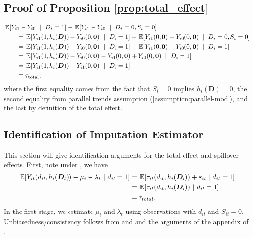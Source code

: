 \subsection{Proof of Proposition \ref{prop:total_effect}}

\begin{align*}
    &\expec{Y_{i1} - Y_{i0} \ \mid \ D_i = 1} - \expec{Y_{i1} - Y_{i0} \ \mid \ D_i = 0, S_i =0} \\
    &\quad\quad= \expec{Y_{i1}(1, h_i(\bm{D})) - Y_{i0}(0, \bm{0}) \ \mid \ D_i = 1} - \expec{Y_{i1}(0, \bm{0}) - Y_{i0}(0, \bm{0}) \ \mid \ D_i = 0, S_i =0} \\
    &\quad\quad= \expec{Y_{i1}(1, h_i(\bm{D})) - Y_{i0}(0, \bm{0}) \ \mid \ D_i = 1} - \expec{Y_{i1}(0, \bm{0}) - Y_{i0}(0, \bm{0}) \ \mid \ D_i = 1} \\
    &\quad\quad= \expec{Y_{i1}(1, h_i(\bm{D})) - Y_{i0}(0, \bm{0}) - Y_{i1}(0, \bm{0}) + Y_{i0}(0, \bm{0}) \ \mid \ D_i = 1} \\
    &\quad\quad= \expec{Y_{i1}(1, h_i(\bm{D})) - Y_{i1}(0, \bm{0}) \ \mid \ D_i = 1} \\
    &\quad\quad\equiv \tau_{\text{total}},
\end{align*}
where the first equality comes from the fact that $S_i = 0$ implies $h_i(\bm{D}) = 0$, the second equality from parallel trends assumption (\ref{assumption:parallel-mod}), and the last by definition of the total effect.



\subsection{Identification of Imputation Estimator}\label{sec:identification_imputation}

This section will give identification arguments for the total effect and spillover effects. First, note under , we have 
\begin{align*}
  \expec{Y_{it}(d_{it}, h_i(\bm{D}_t)) - \mu_i - \lambda_t \ | \ d_{it} = 1} 
  &= \expec{\tau_{it}(d_{it}, h_i(\bm{D}_t)) + \varepsilon_{it} \ | \ d_{it} = 1} \\
  &= \expec{\tau_{it}(d_{it}, h_i(\bm{D}_t)) \ | \ d_{it} = 1} \\
  &= \tau_{total}.
\end{align*}
In the first stage, we estimate $\mu_i$ and $\lambda_t$ using observations with $d_{it}$ and $S_{it} = 0$. Unbiasedness/consistency follows from  and  and the arguments of the appendix of \citet{Gardner_2021}.

